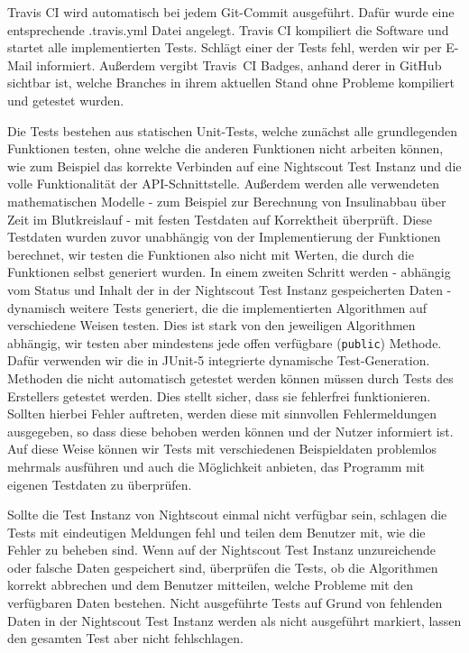 \documentclass[accentcolor=tud0b,12pt,paper=a4]{tudreport}
\begin{document}
Travis CI wird automatisch bei jedem Git-Commit ausgeführt. Dafür wurde eine entsprechende .travis.yml Datei angelegt. Travis CI kompiliert die Software und startet alle implementierten Tests. Schlägt einer der Tests fehl, werden wir per E-Mail informiert. Außerdem vergibt \mbox{Travis CI} Badges, anhand derer in GitHub sichtbar ist, welche Branches in ihrem aktuellen Stand ohne Probleme kompiliert und getestet wurden.

Die Tests bestehen aus statischen Unit-Tests, welche zunächst alle grundlegenden Funktionen testen, ohne welche die anderen Funktionen nicht arbeiten können, wie zum Beispiel das korrekte Verbinden auf eine Nightscout Test Instanz und die volle Funktionalität der API-Schnittstelle. Außerdem werden alle verwendeten mathematischen Modelle - zum Beispiel zur Berechnung von Insulinabbau über Zeit im Blutkreislauf - mit festen Testdaten auf Korrektheit überprüft. Diese Testdaten wurden zuvor unabhängig von der Implementierung der Funktionen berechnet, wir testen die Funktionen also nicht mit Werten, die durch die Funktionen selbst generiert wurden. In einem zweiten Schritt werden - abhängig vom Status und Inhalt der in der Nightscout Test Instanz gespeicherten Daten - dynamisch weitere Tests generiert, die die implementierten Algorithmen auf verschiedene Weisen testen. Dies ist stark von den jeweiligen Algorithmen abhängig, wir testen aber mindestens jede offen verfügbare (\texttt{public}) Methode. Dafür verwenden wir die in JUnit-5 integrierte dynamische Test-Generation. Methoden die nicht automatisch getestet werden können müssen durch Tests des Erstellers getestet werden. Dies stellt sicher, dass sie fehlerfrei funktionieren. Sollten hierbei Fehler auftreten, werden diese mit sinnvollen Fehlermeldungen ausgegeben, so dass diese behoben werden können und der Nutzer informiert ist. Auf diese Weise können wir Tests mit verschiedenen Beispieldaten problemlos mehrmals ausführen und auch die Möglichkeit anbieten, das Programm mit eigenen Testdaten zu überprüfen. 

Sollte die Test Instanz von Nightscout einmal nicht verfügbar sein, schlagen die Tests mit eindeutigen Meldungen fehl und teilen dem Benutzer mit, wie die Fehler zu beheben sind. Wenn auf der Nightscout Test Instanz unzureichende oder falsche Daten gespeichert sind, überprüfen die Tests, ob die Algorithmen korrekt abbrechen und dem Benutzer mitteilen, welche Probleme mit den verfügbaren Daten bestehen. Nicht ausgeführte Tests auf Grund von fehlenden Daten in der Nightscout Test Instanz  werden als nicht ausgeführt markiert, lassen den gesamten Test aber nicht fehlschlagen.
\end{document}
